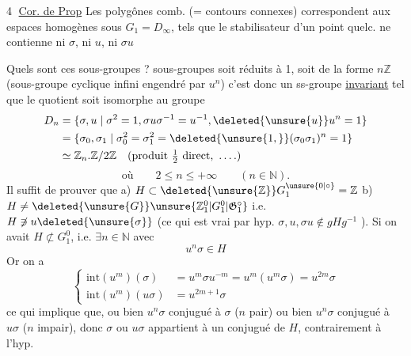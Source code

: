 \textcircled{\small 4} \uline{Cor. de Prop} Les polygônes comb. (= contours
connexes) correspondent aux espaces homogènes
sous $G_1=D_\infty$, tels que le stabilisateur d'un
point quelc. ne contienne ni $\sigma$, ni $u$, ni $\sigma u$

Quels sont ces sous-groupes  ?  
 sous-groupes  soit réduits
à 1, soit de la forme $n\mathbb Z$  (sous-groupe cyclique
infini engendré par $u^n$)  c'est
donc un ss-groupe \uline{invariant} tel que le
quotient soit isomorphe au groupe
\[
\begin{aligned}
D_n&=\{\sigma,u\mid\sigma^2=1,\sigma u\sigma^{-1}=u^{-1},\deleted{\unsure{u}}u^n=1\}\\
&=\{\sigma_0,\sigma_1\mid\sigma_0^2=\sigma_1^2=\deleted{\unsure{1,}}(\sigma_0\sigma_1)^n=1\}\\
&\simeq \mathbb Z_n.\mathbb Z/2\mathbb Z\quad(\text{produit }\tfrac12\text{ direct, }\ldots.)
\end{aligned}
\]
\[
\text{où}\qquad 2\leq n\leq+\infty\qquad(n\in\mathbb N).
\]
Il suffit de prouver que \qquad a) $H\subset\deleted{\unsure{\mathbb Z}}G_1^{\unsure{0|\circ}}=\mathbb Z$
b) $H\ne\deleted{\unsure{G}}\unsure{\mathbb Z_1^0|G_1^0|\mathfrak G_1^\circ}$ i.e. $H\not\ni u\deleted{\unsure{\sigma}}$ (ce qui est vrai par
hyp. $\sigma,u,\sigma u\notin gHg^{-1}$ ). Si on avait $H\not\subset G_1^0$,
i.e. $\exists n\in\mathbb N$ avec
\[
u^n\sigma\in H
\]
Or on a 
\[
\left\{\begin{aligned}
\mathrm{int}(u^m)(\sigma)&=u^m\sigma u^{-m}=u^m(u^m\sigma)=u^{2m}\sigma\\
\mathrm{int}(u^m)(u\sigma)&=u^{2m+1}\sigma
\end{aligned}\right.
\]
ce qui implique que, ou bien $u^n\sigma$ conjugué
à $\sigma$ ($n$ pair) ou bien $u^n\sigma$ conjugué à $u\sigma$
($n$ impair), donc $\sigma$ ou $u\sigma$ appartient à un
conjugué de $H$, contrairement à l'hyp.
